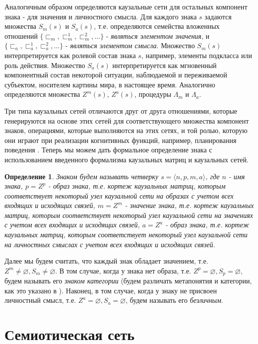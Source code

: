 \documentclass[12pt]{scrartcl}
\newtheorem{definition}{Определение}
\begin{document}
	Аналогичным образом определяются каузальные сети для остальных компонент знака - для значения и личностного смысла. Для каждого знака $s$ задаются множества $S_m(s)$ и $S_a(s)$, т.е. определяются семейства вложенных отношений $\{\sqsubset_m,\sqsubset_m^1,\sqsubset_m^2,\dots\}$ - \textit{являться элементом значения}, и $\{\sqsubset_a,\sqsubset_a^1,\sqsubset_a^2,\dots\}$ - \textit{являться элементом смысла}. Множество $S_m(s)$ интерпретируется как ролевой состав знака $s$, например, элементы подкласса или роль действия. Множество $S_a(s)$ интерпретируется как мгновенный компонентный состав некоторой ситуации, наблюдаемой и переживаемой субъектом, носителем картины мира, в настоящее время. Аналогично определяются множества $Z^m(s)$, $Z^a(s)$, процедуры $\Lambda_m$ и $\Lambda_a$.
	
	Три типа каузальных сетей отличаются друг от друга отношениями, которые генерируются на основе этих сетей для соответствующего множества компонент знаков, операциями, которые выполняются на этих сетях, и той ролью, которую они играют при реализации когнитивных функций, например, планирования поведения \cite{Osipov2015d}. Теперь мы можем дать формальное определение знака \cite{Osipov2015c} с использованием введенного формализма каузальных матриц и каузальных сетей.
	
	\begin{definition}
		Знаком будем называть четверку $s=\langle n, p, m, a \rangle$, где $n$ - имя знака, $p=Z^p$ - образ знака, т.е. кортеж каузальных матриц, которым соответствует некоторый узел каузальной сети на образах с учетом всех входящих и исходящих связей, $m=Z^m$ - значение знака, т.е. кортеж каузальных матриц, которым соответствует некоторый узел каузальной сети на значениях  с учетом всех входящих и исходящих связей, $a=Z^a$ - образ знака, т.е. кортеж каузальных матриц, которым соответствует некоторый узел каузальной сети на личностных смыслах  с учетом всех входящих и исходящих связей.
	\end{definition}
	
	Далее мы будем считать, что каждый знак обладает значением, т.е. $Z^m\not = \varnothing, S_m\not=\varnothing$. В том случае, когда у знака нет образа, т.е. $Z^p=\varnothing,S_p=\varnothing$, будем называть его \textit{знаком категории} (будем различать метапонятия и категории, как это указано в \cite{Osipov1997}). Наконец, в том случае, когда у знаку не присвоен личностный смысл, т.е. $Z^a=\varnothing, S_a=\varnothing$, будем называть его \textit{безличным}.
	
	\section{Семиотическая сеть}
	
\end{document}

